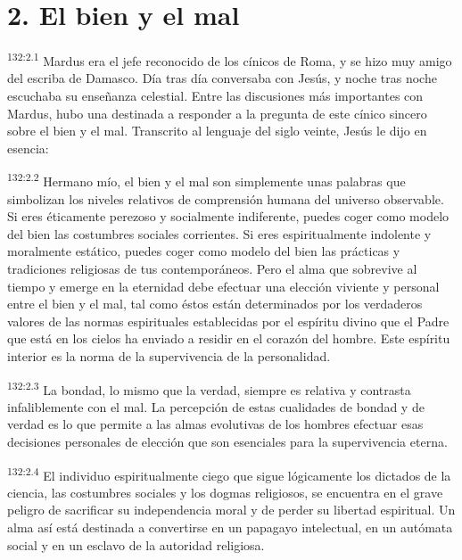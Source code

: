 \section*{2. El bien y el mal}
\par 
\textsuperscript{132:2.1} Mardus era el jefe reconocido de los cínicos de Roma, y se hizo muy amigo del escriba de Damasco. Día tras día conversaba con Jesús, y noche tras noche escuchaba su enseñanza celestial. Entre las discusiones más importantes con Mardus, hubo una destinada a responder a la pregunta de este cínico sincero sobre el bien y el mal. Transcrito al lenguaje del siglo veinte, Jesús le dijo en esencia:

\par 
\textsuperscript{132:2.2} Hermano mío, el bien y el mal son simplemente unas palabras que simbolizan los niveles relativos de comprensión humana del universo observable. Si eres éticamente perezoso y socialmente indiferente, puedes coger como modelo del bien las costumbres sociales corrientes. Si eres espiritualmente indolente y moralmente estático, puedes coger como modelo del bien las prácticas y tradiciones religiosas de tus contemporáneos. Pero el alma que sobrevive al tiempo y emerge en la eternidad debe efectuar una elección viviente y personal entre el bien y el mal, tal como éstos están determinados por los verdaderos valores de las normas espirituales establecidas por el espíritu divino que el Padre que está en los cielos ha enviado a residir en el corazón del hombre. Este espíritu interior es la norma de la supervivencia de la personalidad.

\par 
\textsuperscript{132:2.3} La bondad, lo mismo que la verdad, siempre es relativa y contrasta infaliblemente con el mal. La percepción de estas cualidades de bondad y de verdad es lo que permite a las almas evolutivas de los hombres efectuar esas decisiones personales de elección que son esenciales para la supervivencia eterna.

\par 
\textsuperscript{132:2.4} El individuo espiritualmente ciego que sigue lógicamente los dictados de la ciencia, las costumbres sociales y los dogmas religiosos, se encuentra en el grave peligro de sacrificar su independencia moral y de perder su libertad espiritual. Un alma así está destinada a convertirse en un papagayo intelectual, en un autómata social y en un esclavo de la autoridad religiosa.

